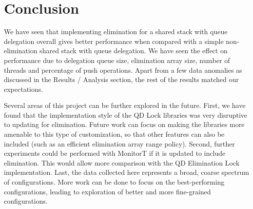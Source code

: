 \section{Conclusion}
We have seen that implementing elimination for a shared stack with queue delegation overall gives better performance when compared with a simple non-elimination shared stack with queue delegation. We have seen the effect on performance due to delegation queue size, elimination array size, number of threads and percentage of push operations. Apart from a few data anomalies as discussed in the Results / Analysis section, the rest of the results matched our expectations.

Several areas of this project can be further explored in the future. First, we have found that the implementation style of the QD Lock libraries was very disruptive to updating for elimination. Future work can focus on making the libraries more amenable to this type of customization, so that other features can also be included (such as an efficient elimination array range policy). Second, further experiments could be performed with MonitorT if it is updated to include elimination. This would allow more comparison with the QD Elimination Lock implementation. Last, the data collected here represents a broad, coarse spectrum of configurations. More work can be done to focus on the best-performing configurations, leading to exploration of better and more fine-grained configurations.
